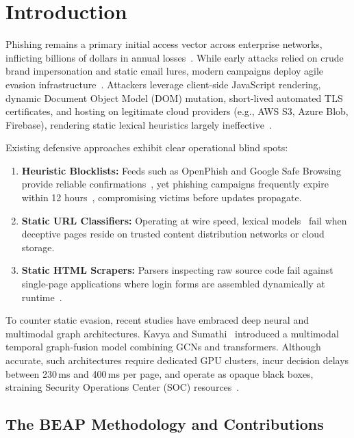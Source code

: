 \documentclass{llncs}
\begin{document}
\section{Introduction}

Phishing remains a primary initial access vector across enterprise networks, inflicting billions of dollars in annual losses~\cite{basit2021,zienie2023}. While early attacks relied on crude brand impersonation and static email lures, modern campaigns deploy agile evasion infrastructure~\cite{tang2021}. Attackers leverage client-side JavaScript rendering, dynamic Document Object Model (DOM) mutation, short-lived automated TLS certificates, and hosting on legitimate cloud providers (e.g., AWS S3, Azure Blob, Firebase), rendering static lexical heuristics largely ineffective~\cite{sanchez2022,castano2023,reyes2024}.

Existing defensive approaches exhibit clear operational blind spots:
\begin{enumerate}[leftmargin=1.8em]
    \item \textbf{Heuristic Blocklists:} Feeds such as OpenPhish and Google Safe Browsing provide reliable confirmations~\cite{purwanto2022}, yet phishing campaigns frequently expire within 12 hours~\cite{castano2023}, compromising victims before updates propagate.
    \item \textbf{Static URL Classifiers:} Operating at wire speed, lexical models~\cite{bu2021,kara2022} fail when deceptive pages reside on trusted content distribution networks or cloud storage.
    \item \textbf{Static HTML Scrapers:} Parsers inspecting raw source code fail against single-page applications where login forms are assembled dynamically at runtime~\cite{lin2021,ariyadasa2022}.
\end{enumerate}

To counter static evasion, recent studies have embraced deep neural and multimodal graph architectures. Kavya and Sumathi~\cite{kavya2025} introduced a multimodal temporal graph-fusion model combining GCNs and transformers. Although accurate, such architectures require dedicated GPU clusters, incur decision delays between 230\,ms and 400\,ms per page, and operate as opaque black boxes, straining Security Operations Center (SOC) resources~\cite{calzarossa2025,chai2022}.

\subsection{The BEAP Methodology and Contributions}
\end{document}
